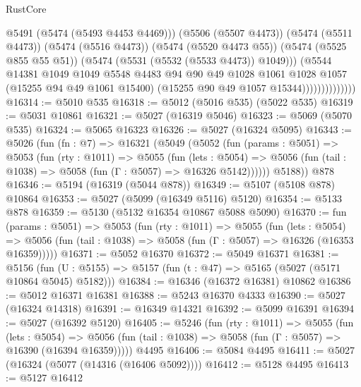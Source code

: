 \begin{lexlean}{RustCore}
\begin{coremodule}
                                @5491
                                (@5474 (@5493 @4453 @4469)))
                              (@5506 (@5507 @4473))
                              (@5474 (@5511 @4473))
                              (@5474 (@5516 @4473))
                              (@5474 (@5520 @4473 @55))
                              (@5474 (@5525 @855 @55 @51))
                              (@5474 (@5531 (@5532 (@5533 @4473)) @1049)))
                            (@5544
                              @14381
                              @1049
                              @1049
                              @5548
                              @4483
                              @94
                              @90
                              @49
                              @1028
                              @1061
                              @1028
                              @1057
                              (@15255 @94 @49 @1061 @15400)
                              (@15255 @90 @49 @1057 @15344))))))))))))))
@16314 := @5010 @535
@16318 := @5012 (@5016 @535) (@5022 @535)
@16319 := @5031 @10861
@16321 := @5027 (@16319 @5046)
@16323 := @5069 (@5070 @535)
@16324 := @5065 @16323
@16326 := @5027 (@16324 @5095)
@16343 := @5026
    (fun (fn : @7) =>
    @16321
      (@5049
        (@5052
          (fun (params : @5051) =>
          @5053
            (fun (rty : @1011) =>
            @5055
              (fun (lets : @5054) =>
              @5056 (fun (tail : @1038) => @5058 (fun (Γ : @5057) => @16326 @5142))))))
        @5188))
    @878
@16346 := @5194 (@16319 (@5044 @878))
@16349 := @5107 (@5108 @878) @10864
@16353 := @5027 (@5099 (@16349 @5116) @5120)
@16354 := @5133 @878
@16359 := @5130 (@5132 @16354 @10867 @5088 @5090)
@16370 := fun (params : @5051) =>
  @5053
    (fun (rty : @1011) =>
    @5055
      (fun (lets : @5054) =>
      @5056 (fun (tail : @1038) => @5058 (fun (Γ : @5057) => @16326 (@16353 @16359)))))
@16371 := @5052 @16370
@16372 := @5049 @16371
@16381 := @5156
    (fun (U : @5155) => @5157 (fun (t : @47) => @5165 (@5027 (@5171 @10864 @5045) @5182)))
@16384 := @16346 (@16372 @16381) @10862
@16386 := @5012 @16371 @16381
@16388 := @5243 @16370 @4333
@16390 := @5027 (@16324 @14318)
@16391 := @16349 @14321
@16392 := @5099 @16391
@16394 := @5027 (@16392 @5120)
@16405 := @5246
    (fun (rty : @1011) =>
    @5055
      (fun (lets : @5054) =>
      @5056 (fun (tail : @1038) => @5058 (fun (Γ : @5057) => @16390 (@16394 @16359)))))
    @4495
@16406 := @5084 @4495
@16411 := @5027 (@16324 (@5077 (@14316 (@16406 @5092))))
@16412 := @5128 @4495
@16413 := @5127 @16412

\end{coremodule}
\end{lexlean}
